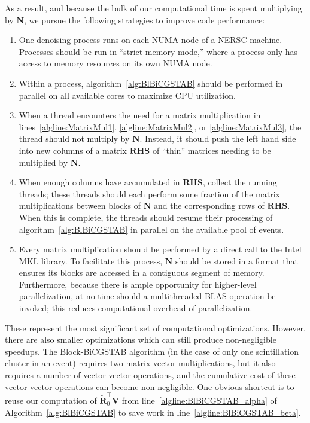 As a result, and because the bulk of our computational time is spent multiplying by $\mathbf{N}$, we pursue the following strategies to improve code performance:
\begin{enumerate}
\item One denoising process runs on each NUMA node of a NERSC machine.  Processes should be run in ``strict memory mode,'' where a process only has access to memory resources on its own NUMA node.
\item Within a process, algorithm~\ref{alg:BlBiCGSTAB} should be performed in parallel on all available cores to maximize CPU utilization.
\item When a thread encounters the need for a matrix multiplication in lines~\ref{algline:MatrixMul1}, \ref{algline:MatrixMul2}, or \ref{algline:MatrixMul3}, the thread should not multiply by $\mathbf{N}$.  Instead, it should push the left hand side into new columns of a matrix $\mathbf{RHS}$ of ``thin'' matrices needing to be multiplied by $\mathbf{N}$.
\item When enough columns have accumulated in $\mathbf{RHS}$, collect the running threads; these threads should each perform some fraction of the matrix multiplications between blocks of $\mathbf{N}$ and the corresponding rows of $\mathbf{RHS}$.  When this is complete, the threads should resume their processing of algorithm~\ref{alg:BlBiCGSTAB} in parallel on the available pool of events.
\item Every matrix multiplication should be performed by a direct call to the Intel MKL library.  To facilitate this process, $\mathbf{N}$ should be stored in a format that ensures its blocks are accessed in a contiguous segment of memory.  Furthermore, because there is ample opportunity for higher-level parallelization, at no time should a multithreaded BLAS operation be invoked; this reduces computational overhead of parallelization.
\end{enumerate}

These represent the most significant set of computational optimizations.  However, there are also smaller optimizations which can still produce non-negligible speedups.  The Block-BiCGSTAB algorithm (in the case of only one scintillation cluster in an event) requires two matrix-vector multiplications, but it also requires a number of vector-vector operations, and the cumulative cost of these vector-vector operations can become non-negligible.  One obvious shortcut is to reuse our computation of $\mathbf{\widetilde{R}}_0^\top \mathbf{V}$ from line~\ref{algline:BlBiCGSTAB_alpha} of Algorithm~\ref{alg:BlBiCGSTAB} to save work in line~\ref{algline:BlBiCGSTAB_beta}.

